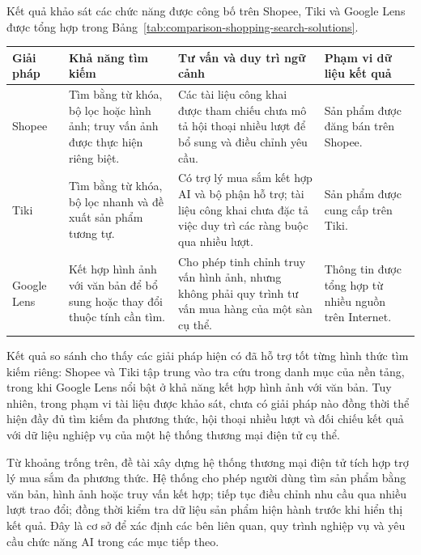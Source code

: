 Kết quả khảo sát các chức năng được công bố trên Shopee, Tiki và Google Lens được
tổng hợp trong Bảng~\ref{tab:comparison-shopping-search-solutions}.

\begin{breakabletable}
    \centering
    \footnotesize
    \caption{So sánh khả năng tìm kiếm và tư vấn sản phẩm của các giải pháp khảo sát}
    \label{tab:comparison-shopping-search-solutions}
    \begin{tabularx}{\textwidth}{|p{}|p{}|p{}|X|}
        \hline
        \textbf{Giải pháp} & \textbf{Khả năng tìm kiếm} & \textbf{Tư vấn và duy trì ngữ cảnh} & \textbf{Phạm vi dữ liệu kết quả} \\ \hline
        Shopee~\cite{shopee2026searchhelp}
        & Tìm bằng từ khóa, bộ lọc hoặc hình ảnh; truy vấn ảnh được thực hiện riêng biệt.
        & Các tài liệu công khai được tham chiếu chưa mô tả hội thoại nhiều lượt để bổ sung và điều chỉnh yêu cầu.
        & Sản phẩm được đăng bán trên Shopee. \\ \hline
        Tiki~\cite{tiki2026sellerfeatures}
        & Tìm bằng từ khóa, bộ lọc nhanh và đề xuất sản phẩm tương tự.
        & Có trợ lý mua sắm kết hợp AI và bộ phận hỗ trợ; tài liệu công khai chưa đặc tả việc duy trì các ràng buộc qua nhiều lượt.
        & Sản phẩm được cung cấp trên Tiki. \\ \hline
        Google Lens~\cite{google2022multisearch}
        & Kết hợp hình ảnh với văn bản để bổ sung hoặc thay đổi thuộc tính cần tìm.
        & Cho phép tinh chỉnh truy vấn hình ảnh, nhưng không phải quy trình tư vấn mua hàng của một sàn cụ thể.
        & Thông tin được tổng hợp từ nhiều nguồn trên Internet. \\ \hline
    \end{tabularx}
\end{breakabletable}

Kết quả so sánh cho thấy các giải pháp hiện có đã hỗ trợ tốt từng hình thức tìm
kiếm riêng: Shopee và Tiki tập trung vào tra cứu trong danh mục của nền tảng,
trong khi Google Lens nổi bật ở khả năng kết hợp hình ảnh với văn bản. Tuy nhiên,
trong phạm vi tài liệu được khảo sát, chưa có giải pháp nào đồng thời thể hiện đầy
đủ tìm kiếm đa phương thức, hội thoại nhiều lượt và đối chiếu kết quả với dữ liệu
nghiệp vụ của một hệ thống thương mại điện tử cụ thể.

Từ khoảng trống trên, đề tài xây dựng hệ thống thương mại điện tử tích hợp trợ lý
mua sắm đa phương thức. Hệ thống cho phép người dùng tìm sản phẩm bằng văn bản,
hình ảnh hoặc truy vấn kết hợp; tiếp tục điều chỉnh nhu cầu qua nhiều lượt trao
đổi; đồng thời kiểm tra dữ liệu sản phẩm hiện hành trước khi hiển thị kết quả. Đây
là cơ sở để xác định các bên liên quan, quy trình nghiệp vụ và yêu cầu chức năng
AI trong các mục tiếp theo.

